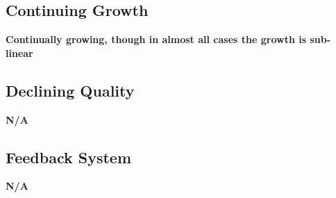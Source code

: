 \subsection{Continuing Growth} %
\label{sub:continuing_growth}

\textbf{Continually growing, though in almost all cases the growth is sub-linear}


\subsection{Declining Quality} %
\label{sub:declining_quality}

\textbf{N/A}


\subsection{Feedback System} %
\label{sub:feedback_system}

\textbf{N/A}


